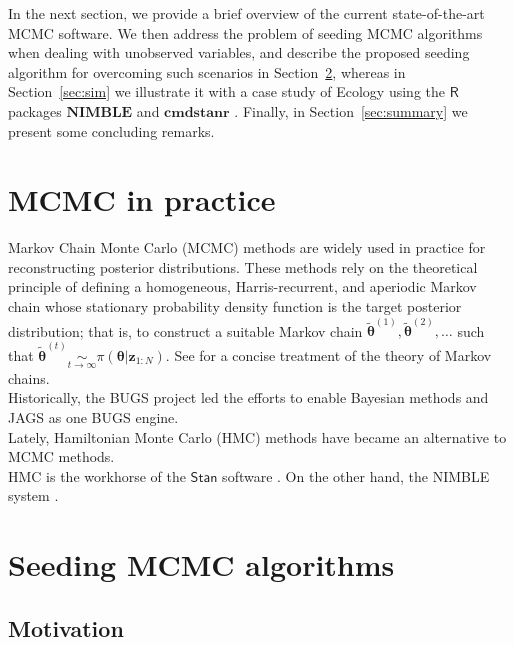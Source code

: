\documentclass[12pt,a4paper]{article}
\begin{document}
In the next section, we provide a brief overview of the current state-of-the-art MCMC software. %
We then address the problem of seeding MCMC algorithms when dealing with unobserved variables, and describe the proposed seeding algorithm for overcoming such scenarios in Section~\ref{sec:alg}, whereas in Section~\ref{sec:sim} we illustrate it with a case study of Ecology using the $\mathsf{R}$ packages $\mathbf{NIMBLE}$ \citep{NIMBLE} and $\mathbf{cmdstanr}$ \citep{cmdstanr}. Finally, in Section~\ref{sec:summary} we present some concluding remarks.

\section{MCMC in practice}
\label{sec:background}

Markov Chain Monte Carlo (MCMC) methods \citep{HMCMC2011} are widely used in practice for reconstructing posterior distributions. These methods rely on the theoretical principle of defining a homogeneous, Harris-recurrent, and aperiodic Markov chain whose stationary probability density function is the target posterior distribution; that is, to construct a suitable Markov chain $\tilde{\boldsymbol{\theta}}^{(1)}, \tilde{\boldsymbol{\theta}}^{(2)}, \ldots$ such that $\tilde{\boldsymbol{\theta}}^{(t)} \underset{t \to \infty}{\sim} \pi(\boldsymbol{\theta} \vert \mathbf{z}_{1:N})$. See \cite{MT2009} for a concise treatment of the theory of Markov chains.\\

Historically, the BUGS project \citep{BUGSbook} led the efforts to enable Bayesian methods  and JAGS \citep{JAGS2003} as one BUGS engine.\\

Lately, Hamiltonian Monte Carlo (HMC) methods \citep{N2011} have became an alternative to MCMC methods.\\

HMC is the workhorse of the $\mathsf{Stan}$ software \citep{Stan2026}. 
On the other hand, the NIMBLE system \citep{NIMBLEpaper}.

\section{Seeding MCMC algorithms}
\label{sec:alg}
 
\subsection{Motivation}
\end{document}
